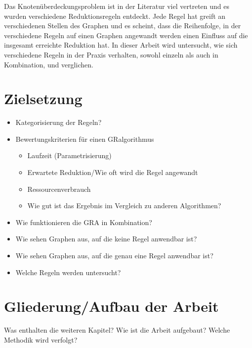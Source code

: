 Das Knotenüberdeckungsproblem ist in der Literatur viel vertreten und es wurden verschiedene Reduktionsregeln entdeckt. Jede Regel hat greift an verschiedenen Stellen des Graphen und es scheint, dass die Reihenfolge, in der verschiedene Regeln auf einen Graphen angewandt werden einen Einfluss auf die insgesamt erreichte Reduktion hat. In dieser Arbeit wird untersucht, wie sich verschiedene Regeln in der Praxis verhalten, sowohl einzeln als auch in Kombination, und verglichen.

\section{Zielsetzung}
\label{ch:Einleitung:sec:Zielsetzung}

\begin{itemize}
\item Kategorisierung der Regeln?
\item Bewertungskriterien für einen GRalgorithmus
	\begin{itemize}
	\item Laufzeit (Parametrisierung)
	\item Erwartete Reduktion/Wie oft wird die Regel angewandt
	\item Ressourcenverbrauch
	\item Wie gut ist das Ergebnis im Vergleich zu anderen Algorithmen?	
	\end{itemize}
\item Wie funktionieren die GRA in Kombination?
\item Wie sehen Graphen aus, auf die keine Regel anwendbar ist?
\item Wie sehen Graphen aus, auf die genau eine Regel anwendbar ist?
\item Welche Regeln werden untersucht?
\end{itemize}


\section{Gliederung/Aufbau der Arbeit}
\label{ch:Einleitung:sec:Gliederung}

Was enthalten die weiteren Kapitel? Wie ist die Arbeit aufgebaut? Welche Methodik wird verfolgt?


